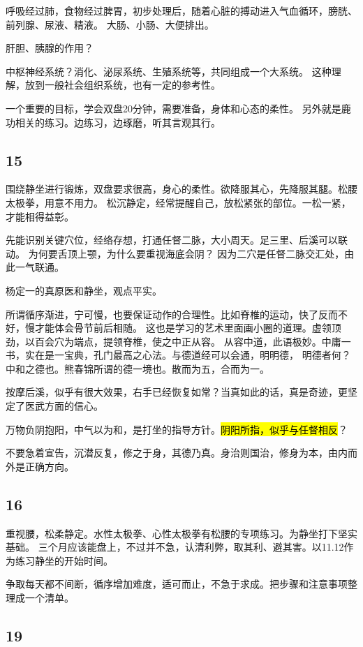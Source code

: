 呼吸经过肺，食物经过脾胃，初步处理后，随着心脏的搏动进入气血循环，膀胱、前列腺、尿液、精液。
大肠、小肠、大便排出。

肝胆、胰腺的作用？

中枢神经系统？消化、泌尿系统、生殖系统等，共同组成一个大系统。
这种理解，放到一般社会组织系统，也有一定的参考性。

一个重要的目标，学会双盘20分钟，需要准备，身体和心态的柔性。
另外就是鹿功相关的练习。边练习，边琢磨，听其言观其行。

\subsection{15}

围绕静坐进行锻炼，双盘要求很高，身心的柔性。欲降服其心，先降服其腿。松腰太极拳，用意不用力。
松沉静定，经常提醒自己，放松紧张的部位。一松一紧，才能相得益彰。

先能识别关键穴位，经络存想，打通任督二脉，大小周天。足三里、后溪可以联动。
为何要舌顶上颚，为什么要重视海底会阴？ 因为二穴是任督二脉交汇处，由此一气联通。

杨定一的真原医和静坐，观点平实。

所谓循序渐进，宁可慢，也要保证动作的合理性。比如脊椎的运动，快了反而不好，慢才能体会骨节前后相随。
这也是学习的艺术里面画小圈的道理。虚领顶劲，以百会穴为端点，提领脊椎，使之中正从容。
从容中道，此语极妙。中庸一书，实在是一宝典，孔门最高之心法。与德道经可以会通，明明德，
明德者何？中和之德也。熊春锦所谓的德一境也。散而为五，合而为一。

按摩后溪，似乎有很大效果，右手已经恢复如常？当真如此的话，真是奇迹，更坚定了医武方面的信心。

万物负阴抱阳，中气以为和，是打坐的指导方针。\hl{阴阳所指，似乎与任督相反}？

不要急着宣告，沉潜反复，修之于身，其德乃真。身治则国治，修身为本，由内而外是正确方向。

\subsection{16}

重视腰，松柔静定。水性太极拳、心性太极拳有松腰的专项练习。为静坐打下坚实基础。
三个月应该能盘上，不过并不急，认清利弊，取其利、避其害。以11.12作为练习静坐的开始时间。

争取每天都不间断，循序增加难度，适可而止，不急于求成。把步骤和注意事项整理成一个清单。

\subsection{19}

